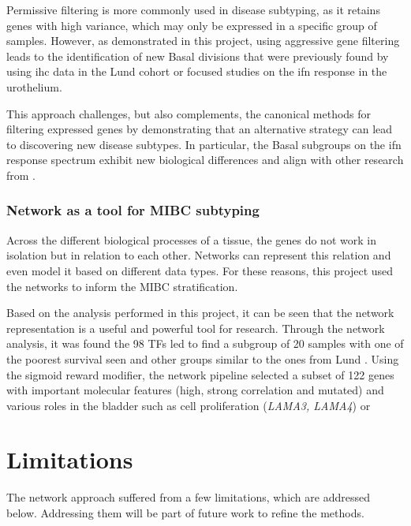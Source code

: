 Permissive filtering is more commonly used in disease subtyping, as it retains genes with high variance, which may only be expressed in a specific group of samples. However, as demonstrated in this project, using aggressive gene filtering leads to the identification of new Basal divisions that were previously found by using \acrshort{ihc} data in the Lund cohort \citep{Marzouka2018-ge} or focused studies on the \acrshort{ifn} response in the urothelium.

This approach challenges, but also complements, the canonical methods for filtering expressed genes by demonstrating that an alternative strategy can lead to discovering new disease subtypes. In particular, the Basal subgroups on the \acrshort{ifn} response spectrum exhibit new biological differences and align with other research from \citep{Marzouka2018-ge,Baker2022-bj}.


\subsubsection*{Network as a tool for MIBC subtyping}

Across the different biological processes of a tissue, the genes do not work in isolation but in relation to each other. Networks can represent this relation and even model it based on different data types. For these reasons, this project used the networks to inform the MIBC stratification. 

Based on the analysis performed in this project, it can be seen that the network representation is a useful and powerful tool for research. Through the network analysis, it was found the 98 TFs led to find a subgroup of 20 samples with one of the poorest survival seen and other groups similar to the ones from Lund \citep{Marzouka2018-ge}. Using the sigmoid reward modifier, the network pipeline selected a subset of 122 genes with important molecular features (high, strong correlation and mutated) and various roles in the bladder such as cell proliferation (\textit{LAMA3, LAMA4}) or 

\section{Limitations} \label{s:limitations}

The network approach suffered from a few limitations, which are addressed below. Addressing them will be part of future work to refine the methods.

